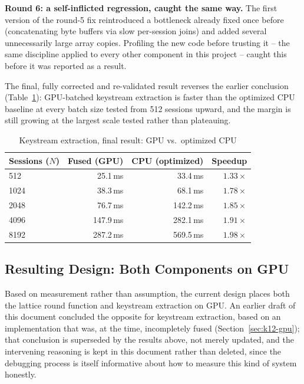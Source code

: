 \documentclass[twocolumn,10pt,journal,compsoc]{IEEEtran}
\begin{document}
\textbf{Round 6: a self-inflicted regression, caught the same way.} The first version of the round-5 fix reintroduced a bottleneck already fixed once before (concatenating byte buffers via slow per-session joins) and added several unnecessarily large array copies. Profiling the new code before trusting it -- the same discipline applied to every other component in this project -- caught this before it was reported as a result.

The final, fully corrected and re-validated result reverses the earlier conclusion (Table~\ref{tab:k12-gpu-final}): GPU-batched keystream extraction is faster than the optimized CPU baseline at every batch size tested from 512 sessions upward, and the margin is still growing at the largest scale tested rather than plateauing.

\begin{table}[h]
\centering
\caption{Keystream extraction, final result: GPU vs.\ optimized CPU}
\label{tab:k12-gpu-final}
\begin{tabular}{@{}lrrr@{}}
\toprule
Sessions ($N$) & Fused (GPU) & CPU (optimized) & Speedup \\
\midrule
512  & 25.1\,ms  & 33.4\,ms  & $1.33\times$ \\
1024 & 38.3\,ms  & 68.1\,ms  & $1.78\times$ \\
2048 & 76.7\,ms  & 142.2\,ms & $1.85\times$ \\
4096 & 147.9\,ms & 282.1\,ms & $1.91\times$ \\
8192 & 287.2\,ms & 569.5\,ms & $1.98\times$ \\
\bottomrule
\end{tabular}
\end{table}

\subsection{Resulting Design: Both Components on GPU}
\label{sec:hybrid}
Based on measurement rather than assumption, the current design places both the lattice round function and keystream extraction on GPU. An earlier draft of this document concluded the opposite for keystream extraction, based on an implementation that was, at the time, incompletely fused (Section~\ref{sec:k12-gpu}); that conclusion is superseded by the results above, not merely updated, and the intervening reasoning is kept in this document rather than deleted, since the debugging process is itself informative about how to measure this kind of system honestly.
\end{document}
